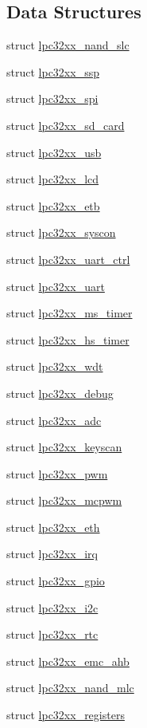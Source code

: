 \subsection*{Data Structures}
\begin{DoxyCompactItemize}
\item 
struct \mbox{\hyperlink{structlpc32xx__nand__slc}{lpc32xx\+\_\+nand\+\_\+slc}}
\item 
struct \mbox{\hyperlink{structlpc32xx__ssp}{lpc32xx\+\_\+ssp}}
\item 
struct \mbox{\hyperlink{structlpc32xx__spi}{lpc32xx\+\_\+spi}}
\item 
struct \mbox{\hyperlink{structlpc32xx__sd__card}{lpc32xx\+\_\+sd\+\_\+card}}
\item 
struct \mbox{\hyperlink{structlpc32xx__usb}{lpc32xx\+\_\+usb}}
\item 
struct \mbox{\hyperlink{structlpc32xx__lcd}{lpc32xx\+\_\+lcd}}
\item 
struct \mbox{\hyperlink{structlpc32xx__etb}{lpc32xx\+\_\+etb}}
\item 
struct \mbox{\hyperlink{structlpc32xx__syscon}{lpc32xx\+\_\+syscon}}
\item 
struct \mbox{\hyperlink{structlpc32xx__uart__ctrl}{lpc32xx\+\_\+uart\+\_\+ctrl}}
\item 
struct \mbox{\hyperlink{structlpc32xx__uart}{lpc32xx\+\_\+uart}}
\item 
struct \mbox{\hyperlink{structlpc32xx__ms__timer}{lpc32xx\+\_\+ms\+\_\+timer}}
\item 
struct \mbox{\hyperlink{structlpc32xx__hs__timer}{lpc32xx\+\_\+hs\+\_\+timer}}
\item 
struct \mbox{\hyperlink{structlpc32xx__wdt}{lpc32xx\+\_\+wdt}}
\item 
struct \mbox{\hyperlink{structlpc32xx__debug}{lpc32xx\+\_\+debug}}
\item 
struct \mbox{\hyperlink{structlpc32xx__adc}{lpc32xx\+\_\+adc}}
\item 
struct \mbox{\hyperlink{structlpc32xx__keyscan}{lpc32xx\+\_\+keyscan}}
\item 
struct \mbox{\hyperlink{structlpc32xx__pwm}{lpc32xx\+\_\+pwm}}
\item 
struct \mbox{\hyperlink{structlpc32xx__mcpwm}{lpc32xx\+\_\+mcpwm}}
\item 
struct \mbox{\hyperlink{structlpc32xx__eth}{lpc32xx\+\_\+eth}}
\item 
struct \mbox{\hyperlink{structlpc32xx__irq}{lpc32xx\+\_\+irq}}
\item 
struct \mbox{\hyperlink{structlpc32xx__gpio}{lpc32xx\+\_\+gpio}}
\item 
struct \mbox{\hyperlink{structlpc32xx__i2c}{lpc32xx\+\_\+i2c}}
\item 
struct \mbox{\hyperlink{structlpc32xx__rtc}{lpc32xx\+\_\+rtc}}
\item 
struct \mbox{\hyperlink{structlpc32xx__emc__ahb}{lpc32xx\+\_\+emc\+\_\+ahb}}
\item 
struct \mbox{\hyperlink{structlpc32xx__nand__mlc}{lpc32xx\+\_\+nand\+\_\+mlc}}
\item 
struct \mbox{\hyperlink{structlpc32xx__registers}{lpc32xx\+\_\+registers}}
\end{DoxyCompactItemize}
